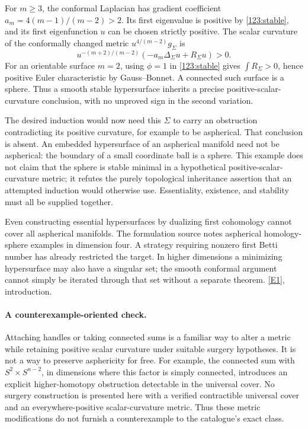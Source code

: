 \documentclass[11pt,a4paper]{article}
\newcommand{\eref}[2]{\hyperlink{extra:#1:#2}{[E#2]}}
\numberwithin{equation}{section}
\begin{document}
For $m\geq3$, the conformal Laplacian has gradient coefficient
$a_m=4(m-1)/(m-2)>2$.  Its first eigenvalue is positive by
\eqref{123:stable}, and its first eigenfunction $u$ can be chosen
strictly positive.  The scalar curvature of the conformally changed
metric $u^{4/(m-2)}g_\Sigma$ is
\[
 u^{-(m+2)/(m-2)}(-a_m\Delta_\Sigma u+R_\Sigma u)>0.
\]
For an orientable surface $m=2$, using $\phi=1$ in
\eqref{123:stable} gives $\int R_\Sigma>0$, hence positive Euler
characteristic by Gauss--Bonnet.  A connected such surface is a sphere.
Thus a smooth stable hypersurface inherits a precise positive-scalar-
curvature conclusion, with no unproved sign in the second variation.

The desired induction would now need this $\Sigma$ to carry an
obstruction contradicting its positive curvature, for example to be
aspherical.  That conclusion is absent.  An embedded hypersurface of
an aspherical manifold need not be aspherical: the boundary of a small
coordinate ball is a sphere.  This example does not claim that the
sphere is stable minimal in a hypothetical positive-scalar-curvature
metric; it refutes the purely topological inheritance assertion that
an attempted induction would otherwise use.  Essentiality, existence,
and stability must all be supplied together.

Even constructing essential hypersurfaces by dualizing first cohomology
cannot cover all aspherical manifolds.  The formulation source notes
aspherical homology-sphere examples in dimension four.  A strategy
requiring nonzero first Betti number has already restricted the target.
In higher dimensions a minimizing hypersurface may also have a singular
set; the smooth conformal argument cannot simply be iterated through
that set without a separate theorem. \eref{123}{1}, introduction.

\paragraph{A counterexample-oriented check.}
Attaching handles or taking connected sums is a familiar way to alter
a metric while retaining positive scalar curvature under suitable
surgery hypotheses.  It is not a way to preserve asphericity for free.
For example, the connected sum with $S^2\times S^{n-2}$, in dimensions
where this factor is simply connected, introduces an explicit
higher-homotopy obstruction detectable in the universal cover.
No surgery construction is presented here with a verified contractible
universal cover and an everywhere-positive scalar-curvature metric.
Thus these metric modifications do not furnish a counterexample to the
catalogue's exact class.
\end{document}
